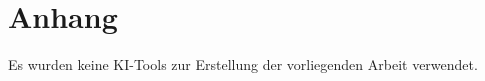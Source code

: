 \chapter{Anhang}\label{app:supplemental-information}

Es wurden keine KI-Tools zur Erstellung der vorliegenden Arbeit verwendet. 